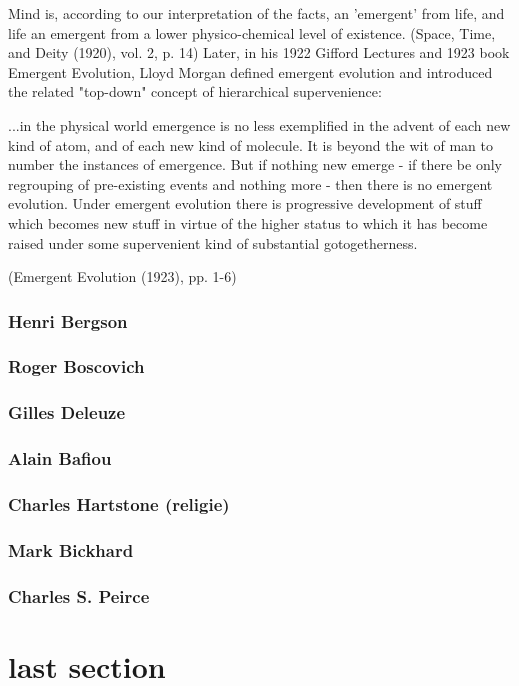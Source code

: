 \documentclass[a4paper]{Thesis}
\begin{document}
	Mind is, according to our interpretation of the facts, an 'emergent' from life, and life an emergent from a lower physico-chemical level of existence.
	(Space, Time, and Deity (1920), vol. 2, p. 14)
	Later, in his 1922 Gifford Lectures and 1923 book Emergent Evolution, Lloyd Morgan defined emergent evolution and introduced the related "top-down" concept of hierarchical supervenience:
	
	...in the physical world emergence is no less exemplified in the advent of each new kind of atom, and of each new kind of molecule. It is beyond the wit of man to number the instances of emergence. But if nothing new emerge - if there be only regrouping of pre-existing events and nothing more - then there is no emergent evolution.
	Under emergent evolution there is progressive development of stuff which becomes new stuff in virtue of the higher status to which it has become raised under some supervenient kind of substantial gotogetherness.
	
	(Emergent Evolution (1923), pp. 1-6)
	
	\subsubsection{Henri Bergson}
	\subsubsection{Roger Boscovich}
	\subsubsection{Gilles Deleuze}
	\subsubsection{Alain Bafiou}
	\subsubsection{Charles Hartstone (religie)}
	\subsubsection{Mark Bickhard}
	\subsubsection{Charles S. Peirce}



\section{last section}
\end{document}

